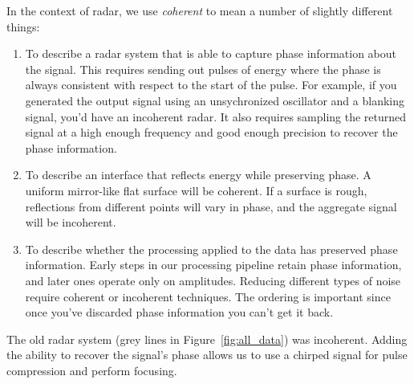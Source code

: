 \documentclass[11pt]{article}
\newcommand{\todo}[1]{\ifthenelse{\boolean{include-todos}} {\textcolor{Red}{\textbf{TODO: #1}}}{}}
\newcommand{\question}[1]{\ifthenelse{\boolean{include-questions}} {\textcolor{Green}{\textbf{QUESTION: #1}}}{}}
\newcommand{\figref}[1]{Figure~\ref{#1}}
\begin{document}
In the context of radar, we use \emph{coherent} to mean a number of slightly different things:
\begin{enumerate}
\item To describe a radar system that is able to capture phase information about the signal. This requires sending out pulses of energy where the phase is always consistent with respect to the start of the pulse. For example, if you generated the output signal using an unsychronized oscillator and a blanking signal, you'd have an incoherent radar. It also requires sampling the returned signal at a high enough frequency and good enough precision to recover the phase information. 
\item To describe an interface that reflects energy while preserving phase. A uniform mirror-like flat surface will be coherent. If a surface is rough, reflections from different points will vary in phase, and the aggregate signal will be incoherent. 
\item To describe whether the processing applied to the data has preserved phase information. Early steps in our processing pipeline retain phase information, and later ones operate only on amplitudes. Reducing different types of noise require coherent or incoherent techniques. The ordering is important since once you've discarded phase information you can't get it back.
\end{enumerate}
    
The old radar system (grey lines in \figref{fig:all_data}) was incoherent. Adding the ability to recover the signal's phase allows us to use a chirped signal for pulse compression and perform focusing. 

%
%
%
%
%
%
\end{document}
